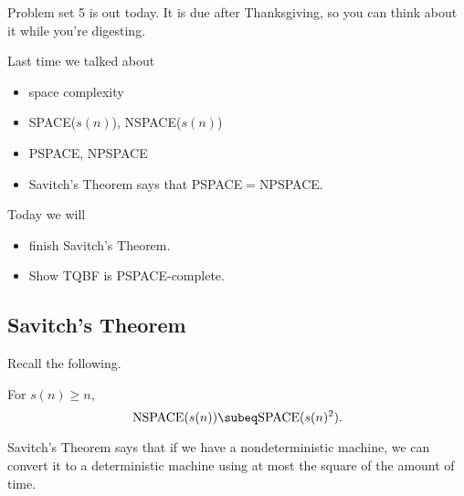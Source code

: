 
Problem set 5 is out today. It is due after Thanksgiving, so you can think about it while you're digesting.

Last time we talked about
\begin{itemize}
\item
space complexity
\item
SPACE($s(n)$), NSPACE($s(n)$)
\item
PSPACE, NPSPACE
\item
Savitch's Theorem says that PSPACE$=$NPSPACE.
\end{itemize}
Today we will
\begin{itemize}
\item
finish Savitch's Theorem.
\item
Show TQBF is PSPACE-complete.
\end{itemize}
\subsection{Savitch's Theorem}
Recall the following.
\begin{thm*}
For $s(n)\ge n$, 
\[
\text{NSPACE}(s(n))\subeq \text{SPACE}(s(n)^2).
\]
\end{thm*}
Savitch's Theorem says that if we have a nondeterministic machine, we can convert it to a deterministic machine using at most the square of the amount of time.


